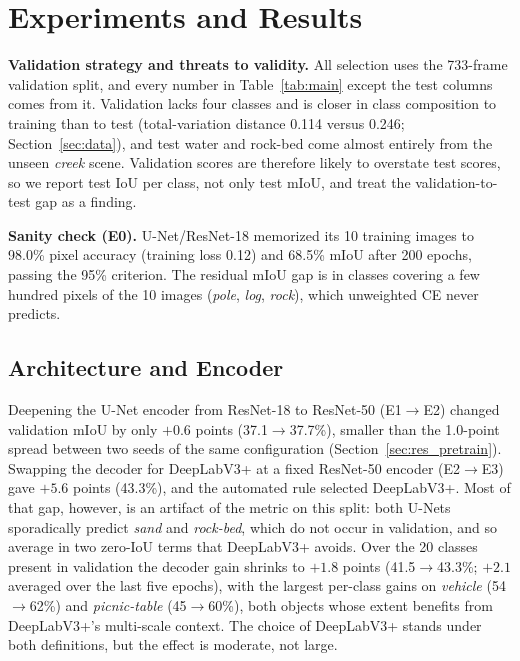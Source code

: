 \section{Experiments and Results}
\label{sec:results}


\textbf{Validation strategy and threats to validity.} All selection uses the
733-frame validation split, and every number in Table~\ref{tab:main} except
the test columns comes from it. Validation lacks four classes and is closer in
class composition to training than to test (total-variation distance 0.114
versus 0.246; Section~\ref{sec:data}), and test water and rock-bed come almost
entirely from the unseen \emph{creek} scene. Validation scores are therefore
likely to overstate test scores, so we report test IoU per class, not only
test mIoU, and treat the validation-to-test gap as a finding.

\textbf{Sanity check (E0).} U-Net/ResNet-18 memorized its 10 training images
to 98.0\% pixel accuracy (training loss 0.12) and 68.5\% mIoU after 200
epochs, passing the 95\% criterion. The residual mIoU gap is in classes covering
a few hundred pixels of the 10 images (\emph{pole}, \emph{log}, \emph{rock}),
which unweighted CE never predicts.

\subsection{Architecture and Encoder}
\label{sec:res_arch}

Deepening the U-Net encoder from ResNet-18 to ResNet-50 (E1$\to$E2) changed
validation mIoU by only $+0.6$ points (37.1$\to$37.7\%), smaller than the
1.0-point spread between two seeds of the same configuration
(Section~\ref{sec:res_pretrain}). Swapping the decoder for DeepLabV3+ at a
fixed ResNet-50 encoder (E2$\to$E3) gave $+5.6$ points (43.3\%), and the
automated rule selected DeepLabV3+. Most of that gap, however, is an artifact
of the metric on this split: both U-Nets sporadically predict \emph{sand} and
\emph{rock-bed}, which do not occur in validation, and so average in two
zero-IoU terms that DeepLabV3+ avoids. Over the 20 classes present in
validation the decoder gain shrinks to $+1.8$ points (41.5$\to$43.3\%; $+2.1$
averaged over the last five epochs), with
the largest per-class gains on \emph{vehicle} (54$\to$62\%) and
\emph{picnic-table} (45$\to$60\%), both objects whose extent benefits from
DeepLabV3+'s multi-scale context. The choice of DeepLabV3+ stands under both
definitions, but the effect is moderate, not large.

